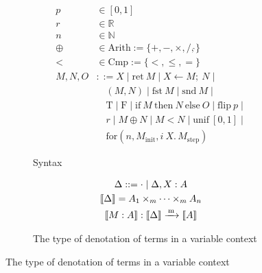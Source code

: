 \begin{figure}[tbp]
  \centering
  \begin{subfigure}[t]{0.95\linewidth}
    \centering
\[
\begin{aligned}
p &\in [0,1] \\
r &\in \mathbb{R} \\
n &\in \mathbb{N} \\
\oplus &\in \mathrm{Arith} := \{+, -, \times, /, \hat{}\} \\
< &\in \mathrm{Cmp} := \{<, \leq, =\} \\
M, N, O &::= X \mid \mathrm{ret}\ M \mid X \leftarrow M;\ N \mid \\
&\quad (M, N) \mid \mathrm{fst}\ M \mid \mathrm{snd}\ M \mid \\
&\quad \mathrm{T} \mid \mathrm{F} \mid \mathrm{if}\ M\ \mathrm{then}\ N\ \mathrm{else}\ O \mid \mathrm{flip}\ p \mid \\
&\quad r \mid M \oplus N \mid M < N \mid \mathrm{unif}\ [0,1] \mid \\
&\quad \mathrm{for}(n, M_{\mathrm{init}}, i\ X.\, M_{\mathrm{step}})
\end{aligned}
\]
    \caption{Syntax}
    \label{fig:term-syntax}
  \end{subfigure}

  \begin{subfigure}[t]{0.95\linewidth}
    \centering
\[
\begin{gathered}
\Delta ::= {} \cdot \mid \Delta, X : A \\
\llbracket \Delta \rrbracket = A_1 \times_m \cdots \times_m A_n \\
\llbracket M : A \rrbracket : \llbracket \Delta \rrbracket \xrightarrow{\,\mathrm{m}\,} \llbracket A \rrbracket
\end{gathered}
\]
    \caption{The type of denotation of terms in a variable context}
    \label{fig:type-context}
  \end{subfigure}


\end{figure}
